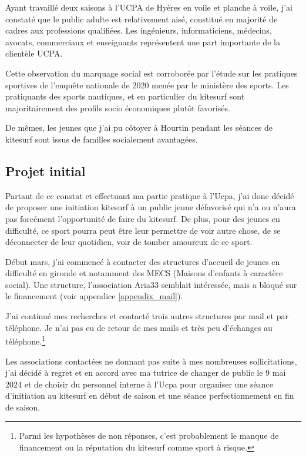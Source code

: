 \documentclass[11pt,a4paper]{report}
\begin{document}
Ayant travaillé deux saisons à l'UCPA de Hyères en voile
et planche à voile, j'ai  constaté que le public adulte est relativement
aisé, constitué en majorité de cadres aux professions qualifiées. Les
ingénieurs, informaticiens, médecins, avocats, commerciaux et enseignants
représentent une part importante de la clientèle UCPA.

Cette observation du marquage social  est corroborée par l'étude sur 
les pratiques sportives de l'enqu\^ete nationale de
2020 menée par le ministère des sports\cite{injep}. Les pratiquants
des sports nautiques, et en particulier du kitesurf sont majoritairement
des profils socio économiques plut\^ot favorisés.

De m\^emes, les jeunes que j'ai pu côtoyer à Hourtin
pendant les séances de kitesurf sont issus de
familles socialement avantagées.

\subsection{Projet initial}

Partant de ce constat et effectuant ma partie pratique à l'Ucpa,
j'ai donc décidé de proposer une initiation kitesurf à un public jeune
défavorisé qui n'a ou n'aura pas forcément l'opportunité de faire du kitesurf. 
De plus, pour des jeunes en difficulté, ce sport pourra peut être 
leur permettre de voir autre chose, de se déconnecter de leur quotidien,
voir de tomber amoureux de ce sport.

Début mars, j'ai commencé à contacter des structures d'accueil de jeunes 
en difficulté en gironde et notamment des MECS (Maisons d'enfants à caractère social).
Une structure, l'association Aria33\cite{aria33} semblait 
intéressée, mais a bloqué sur le financement
(voir appendice \ref{appendix_mail}).

J'ai continué mes recherches et contacté trois autres structures
par mail et par téléphone. Je n'ai pas eu de retour de mes mails 
et très peu d'échanges au téléphone.\footnote{Parmi les hypothèses
de non réponses, c'est probablement le manque de financement ou
la réputation du kitesurf comme sport  à risque.}

Les associations contactées ne donnant pas  suite à mes nombreuses
sollicitations, j'ai décidé à regret et en accord avec ma tutrice
de changer de public le 9 mai 2024 et de choisir du personnel interne
à l'Ucpa pour organiser une séance d'initiation au kitesurf en début 
de saison et une séance perfectionnement en fin de saison.
\end{document}
